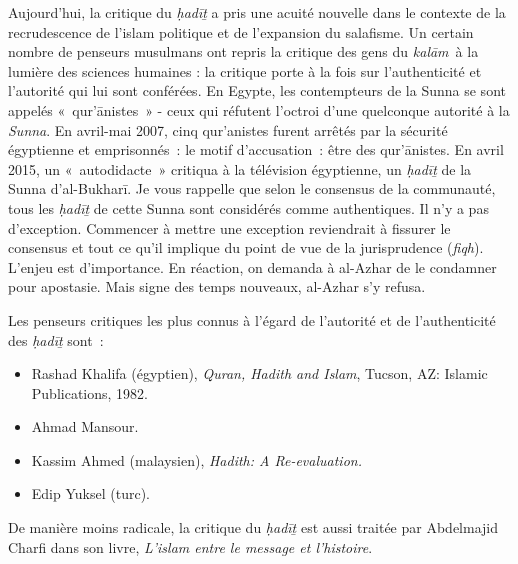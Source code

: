 Aujourd'hui, la critique du \emph{ḥadīṯ} a pris une acuité nouvelle dans
le contexte de la recrudescence de l'islam politique et de l'expansion
du salafisme. Un certain nombre de penseurs musulmans ont repris la
critique des gens du \emph{kalām}~à la lumière des sciences humaines :
la critique porte à la fois sur l'authenticité et l'autorité qui lui
sont conférées. En Egypte, les contempteurs de la Sunna se sont appelés
«~qur'ānistes~» - ceux qui réfutent l'octroi d'une quelconque autorité à
la \emph{Sunna}. En avril-mai 2007, cinq qur'anistes furent arrêtés par
la sécurité égyptienne et emprisonnés~: le motif d'accusation~: être des
qur'ānistes. En avril 2015, un «~autodidacte~» critiqua à la télévision
égyptienne, un \emph{ḥadīṯ} de la Sunna d'al-Bukharī. Je vous rappelle
que selon le consensus de la communauté, tous les \emph{ḥadīṯ} de cette
Sunna sont considérés comme authentiques. Il n'y a pas d'exception.
Commencer à mettre une exception reviendrait à fissurer le consensus et
tout ce qu'il implique du point de vue de la jurisprudence
(\emph{fiqh}). L'enjeu est d'importance. En réaction, on demanda à
al-Azhar de le condamner pour apostasie. Mais signe des temps nouveaux,
al-Azhar s'y refusa.

Les penseurs critiques les plus connus à l'égard de l'autorité et de
l'authenticité des \emph{ḥadīṯ} sont~:

\begin{itemize}
\item
  Rashad Khalifa (égyptien), \emph{Quran, Hadith and Islam}, Tucson, AZ:
  Islamic Publications, 1982.
\item
  Ahmad Mansour.
\item
  Kassim Ahmed (malaysien), \emph{Hadith: A Re-evaluation.}
\item
  Edip Yuksel (turc).
\end{itemize}

De manière moins radicale, la critique du \emph{ḥadīṯ} est aussi traitée
par Abdelmajid Charfi dans son livre, \emph{L'islam entre le message et
l'histoire}.

